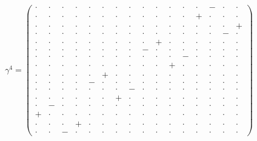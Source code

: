 \documentclass[
  10pt,
]{article}
\begin{document}
\[\gamma^4=\left(\begin{smallmatrix} \cdot & \cdot & \cdot & \cdot & \cdot & \cdot & \cdot & \cdot & \cdot & \cdot & \cdot & \cdot & \cdot & - & \cdot & \cdot \\ \cdot & \cdot & \cdot & \cdot & \cdot & \cdot & \cdot & \cdot & \cdot & \cdot & \cdot & \cdot & + & \cdot & \cdot & \cdot \\ \cdot & \cdot & \cdot & \cdot & \cdot & \cdot & \cdot & \cdot & \cdot & \cdot & \cdot & \cdot & \cdot & \cdot & \cdot & + \\ \cdot & \cdot & \cdot & \cdot & \cdot & \cdot & \cdot & \cdot & \cdot & \cdot & \cdot & \cdot & \cdot & \cdot & - & \cdot \\ \cdot & \cdot & \cdot & \cdot & \cdot & \cdot & \cdot & \cdot & \cdot & + & \cdot & \cdot & \cdot & \cdot & \cdot & \cdot \\ \cdot & \cdot & \cdot & \cdot & \cdot & \cdot & \cdot & \cdot & - & \cdot & \cdot & \cdot & \cdot & \cdot & \cdot & \cdot \\ \cdot & \cdot & \cdot & \cdot & \cdot & \cdot & \cdot & \cdot & \cdot & \cdot & \cdot & - & \cdot & \cdot & \cdot & \cdot \\ \cdot & \cdot & \cdot & \cdot & \cdot & \cdot & \cdot & \cdot & \cdot & \cdot & + & \cdot & \cdot & \cdot & \cdot & \cdot \\ \cdot & \cdot & \cdot & \cdot & \cdot & + & \cdot & \cdot & \cdot & \cdot & \cdot & \cdot & \cdot & \cdot & \cdot & \cdot \\ \cdot & \cdot & \cdot & \cdot & - & \cdot & \cdot & \cdot & \cdot & \cdot & \cdot & \cdot & \cdot & \cdot & \cdot & \cdot \\ \cdot & \cdot & \cdot & \cdot & \cdot & \cdot & \cdot & - & \cdot & \cdot & \cdot & \cdot & \cdot & \cdot & \cdot & \cdot \\ \cdot & \cdot & \cdot & \cdot & \cdot & \cdot & + & \cdot & \cdot & \cdot & \cdot & \cdot & \cdot & \cdot & \cdot & \cdot \\ \cdot & - & \cdot & \cdot & \cdot & \cdot & \cdot & \cdot & \cdot & \cdot & \cdot & \cdot & \cdot & \cdot & \cdot & \cdot \\ + & \cdot & \cdot & \cdot & \cdot & \cdot & \cdot & \cdot & \cdot & \cdot & \cdot & \cdot & \cdot & \cdot & \cdot & \cdot \\ \cdot & \cdot & \cdot & + & \cdot & \cdot & \cdot & \cdot & \cdot & \cdot & \cdot & \cdot & \cdot & \cdot & \cdot & \cdot \\ \cdot & \cdot & - & \cdot & \cdot & \cdot & \cdot & \cdot & \cdot & \cdot & \cdot & \cdot & \cdot & \cdot & \cdot & \cdot \end{smallmatrix}\right)\qquad
\]
\end{document}
